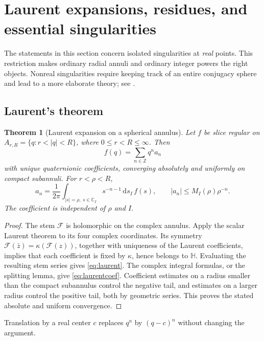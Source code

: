 \documentclass[11pt,a4paper]{article}
\numberwithin{equation}{section}
\newtheorem{theorem}{Theorem}[section]
\theoremstyle{definition}
\theoremstyle{remark}
\newcommand{\C}{\mathbb C}
\newcommand{\HH}{\mathbb H}
\begin{document}
\section{Laurent expansions, residues, and essential singularities}
\label{sec:laurent}
The statements in this section concern isolated singularities at \emph{real}
points. This restriction makes ordinary radial annuli and ordinary integer
powers the right objects. Nonreal singularities require keeping track of an
entire conjugacy sphere and lead to a more elaborate theory; see
\cite{GPStSing}.

\subsection{Laurent's theorem}
\begin{theorem}[Laurent expansion on a spherical annulus]
\label{thm:laurent}
Let $f$ be slice regular on $A_{r,R}=\{q:r<|q|<R\}$, where
$0\le r<R\le\infty$. Then
\begin{equation}
 f(q)=\sum_{n\in\mathbb Z}q^n a_n
 \label{eq:laurent}
\end{equation}
with unique quaternionic coefficients, converging absolutely and uniformly
on compact subannuli. For $r<\rho<R$,
\begin{equation}
 a_n=\frac1{2\pi}\int_{|s|=\rho,\ s\in\C_I}
        s^{-n-1}\,\mathrm ds_I\,f(s),
 \qquad |a_n|\le M_I(\rho)\rho^{-n}.
 \label{eq:laurentcoef}
\end{equation}
The coefficient is independent of $\rho$ and $I$.
\end{theorem}
\begin{proof}
The stem $\mathcal F$ is holomorphic on the complex annulus. Apply the scalar
Laurent theorem to its four complex coordinates. Its symmetry
$\mathcal F(\bar z)=\kappa(\mathcal F(z))$, together with uniqueness of the
Laurent coefficients, implies that each coefficient is fixed by $\kappa$,
hence belongs to $\HH$. Evaluating the resulting stem series gives
\eqref{eq:laurent}. The complex integral formulas, or the splitting lemma,
give \eqref{eq:laurentcoef}. Coefficient estimates on a radius smaller than
the compact subannulus control the negative tail, and estimates on a larger
radius control the positive tail, both by geometric series. This proves the
stated absolute and uniform convergence.
\end{proof}
Translation by a real center $c$ replaces $q^n$ by $(q-c)^n$ without changing
the argument.
\end{document}
